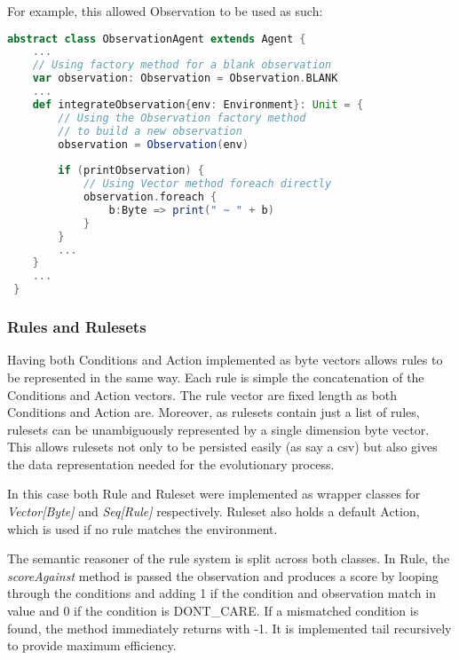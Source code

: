 For example, this allowed Observation to be used as such:

\begin{minipage}{0.9\linewidth}
\centering
\begin{lstlisting}[language=scala]
abstract class ObservationAgent extends Agent {
    ...
    // Using factory method for a blank observation
    var observation: Observation = Observation.BLANK
    ...
    def integrateObservation{env: Environment}: Unit = {
        // Using the Observation factory method 
        // to build a new observation
        observation = Observation(env)
        
        if (printObservation) {
            // Using Vector method foreach directly
            observation.foreach { 
                b:Byte => print(" ~ " + b)
            }
        } 
        ...
    }
    ...
 }

\end{lstlisting}
\end{minipage}


\subsubsection{Rules and Rulesets}

Having both Conditions and Action implemented as byte vectors allows rules to be represented in the same way. Each rule is simple the concatenation of the Conditions and Action vectors. The rule vector are fixed length as both Conditions and Action are. Moreover, as rulesets contain just a list of rules, rulesets can be unambiguously represented by a single dimension byte vector. This allows rulesets not only to be persisted easily (as say a csv) but also gives the data representation needed for the evolutionary process.

In this case both Rule and Ruleset were implemented as wrapper classes for \emph{Vector[Byte]} and \emph{Seq[Rule]} respectively. Ruleset also holds a default Action, which is used if no rule matches the environment.

The semantic reasoner of the rule system is split across both classes. In Rule, the \emph{scoreAgainst} method is passed the observation and produces a score by looping through the conditions and adding 1 if the condition and observation match in value and 0 if the condition is {\footnotesize DONT\_CARE}. If a mismatched condition is found, the method immediately returns with -1. It is implemented tail recursively to provide maximum efficiency.

